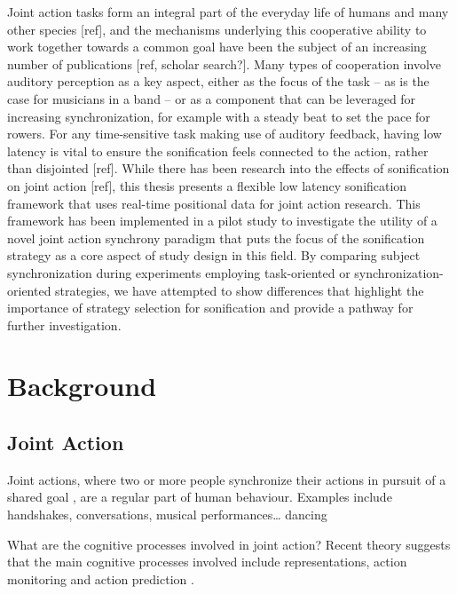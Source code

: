 \documentclass[10pt,a4paper,onecolumn]{article}
\begin{document}
Joint action tasks form an integral part of the everyday life of humans and many other species {[}ref{]},
and the mechanisms underlying this cooperative ability to work together towards a common goal have been
the subject of an increasing number of publications {[}ref, scholar search?{]}. Many types of cooperation
involve auditory perception as a key aspect, either as the focus of the task -- as is the case for
musicians in a band -- or as a component that can be leveraged for increasing synchronization,
for example with a steady beat to set the pace for rowers. For any time-sensitive task making
use of auditory feedback, having low latency is vital to ensure the sonification feels connected
to the action, rather than disjointed {[}ref{]}. While there has been research into the effects of
sonification on joint action {[}ref{]}, this thesis presents a flexible low latency sonification
framework that uses real-time positional data for joint action research. This framework has been
implemented in a pilot study to investigate the utility of a novel joint action synchrony paradigm
that puts the focus of the sonification strategy as a core aspect of study design in this field. By
comparing subject synchronization during experiments employing task-oriented or synchronization-oriented
strategies, we have attempted to show differences that highlight the importance of strategy selection
for sonification and provide a pathway for further investigation.

\hypertarget{background}{%
\section{Background}\label{background}}

\hypertarget{joint-action}{%
\subsection{Joint Action}\label{joint-action}}

Joint actions, where two or more people synchronize their actions in pursuit of a shared goal \autocite{knoblichPsychologicalResearchJoint2011}, are a regular part of human behaviour. Examples include handshakes, conversations, musical performances\ldots{} dancing

What are the cognitive processes involved in joint action? Recent theory suggests that the main cognitive processes involved include representations, action monitoring and action prediction \autocite{vesperMinimalArchitectureJoint2010,loehrMonitoringIndividualJoint2013,sebanzJointActionBodies2006}.
\end{document}
